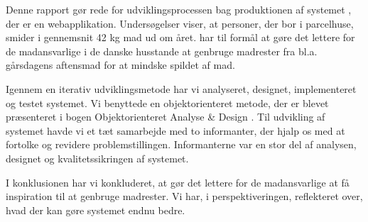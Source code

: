 Denne rapport gør rede for udviklingsprocessen bag produktionen af systemet \Foodl{}, der er en webapplikation. 
Undersøgelser viser, at personer, der bor i parcelhuse, smider i gennemsnit 42 kg mad ud om året.
\Foodl{} har til formål at gøre det lettere for de madansvarlige i de danske husstande at genbruge madrester fra bl.a. gårsdagens aftensmad for at mindske spildet af mad.

Igennem en iterativ udviklingsmetode har vi analyseret, designet, implementeret og testet systemet.
Vi benyttede en objektorienteret metode, der er blevet præsenteret i bogen Objektorienteret Analyse \& Design \cite{ooad}.
Til udvikling af systemet havde vi et tæt samarbejde med to informanter, der hjalp os med at fortolke og revidere problemstillingen. Informanterne var en stor del af analysen, designet og kvalitetssikringen af systemet.

I konklusionen har vi konkluderet, at \Foodl{} gør det lettere for de madansvarlige at få inspiration til at genbruge madrester.
Vi har, i perspektiveringen, reflekteret over, hvad der kan gøre systemet endnu bedre.